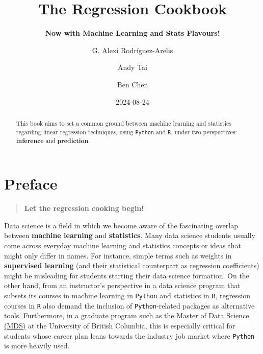 \documentclass[
  letterpaper,
  DIV=11,
  numbers=noendperiod]{scrreprt}
\title{The Regression Cookbook}
\subtitle{\textbf{Now with Machine Learning and Stats Flavours!}}
\author{G. Alexi Rodríguez-Arelis \and Andy Tai \and Ben Chen}
\date{2024-08-24}
\renewcommand*\contentsname{Table of contents}
\newcommand\contentsname{Table of contents}
\begin{document}
\maketitle
\begin{abstract}
This book aims to set a common ground between machine learning and
statistics regarding linear regression techniques, using \texttt{Python}
and \texttt{R}, under two perspectives: \textbf{inference} and
\textbf{prediction}.
\end{abstract}

\renewcommand*\contentsname{Table of contents}
{
\hypersetup{linkcolor=}
\setcounter{tocdepth}{2}
\tableofcontents
}


\chapter*{Preface}\label{preface}


\begin{quote}
\textbf{Let the regression cooking begin!}
\end{quote}

Data science is a field in which we become aware of the fascinating
overlap between \textbf{machine learning} and \textbf{statistics}. Many
data science students usually come across everyday machine learning and
statistics concepts or ideas that might only differ in names. For
instance, simple terms such as weights in \textbf{supervised learning}
(and their statistical counterpart as regression coefficients) might be
misleading for students starting their data science formation. On the
other hand, from an instructor's perspective in a data science program
that subsets its courses in machine learning in \texttt{Python} and
statistics in \texttt{R}, regression courses in \texttt{R} also demand
the inclusion of \texttt{Python}-related packages as alternative tools.
Furthermore, in a graduate program such as the
\href{https://masterdatascience.ubc.ca/}{Master of Data Science (MDS)}
at the University of British Columbia, this is especially critical for
students whose career plan leans towards the industry job market where
\texttt{Python} is more heavily used.
\end{document}
